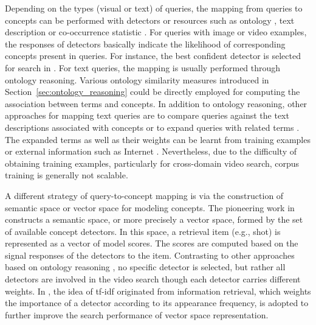 Depending on the types (visual or text) of queries, the mapping from
queries to concepts can be performed with detectors
\cite{M.Campbell:TRECVID:2006} or resources such as ontology
\cite{Shi-YongNeo:ICOIVR:2006,CeesG.M.Snoek:IEEETM:2006,C.G.M.Snoek:NISTTRECVID:2006},
text description \cite{CeesG.M.Snoek:IEEETM:2006} or co-occurrence
statistic \cite{M.Campbell:TRECVID:2006,Shi-YongNeo:ICOIVR:2006}.
%
For queries with image or video examples, the responses of detectors
basically indicate the likelihood of corresponding concepts present
in queries. For instance, the best confident detector is selected
for search in \cite{CeesG.M.Snoek:IEEETM:2006}.
%
For text queries, the mapping is usually performed through ontology
reasoning.
Various ontology similarity measures introduced in
Section~\ref{sec:ontology_reasoning} could be directly employed for
computing the association between terms and concepts.
%
In addition to ontology reasoning, other approaches for mapping text
queries are to compare queries against the text descriptions
associated with concepts \cite{CeesG.M.Snoek:IEEETM:2006} or to
expand queries with related terms \cite{Shi-YongNeo:ICOIVR:2006}.
The expanded terms as well as their weights can be learnt from
training examples \cite{M.Campbell:TRECVID:2006} or external
information such as Internet \cite{Shi-YongNeo:ICOIVR:2006}.
%
Nevertheless, due to the difficulty of obtaining training examples,
particularly for cross-domain video search, corpus training is
generally not scalable.

A different strategy of query-to-concept mapping is via the
construction of semantic space or vector space for modeling
concepts. The pioneering work in
\cite{Apostol(Paul).Natsev:ACMSIGKDD:2004,JohnR.Smith:ICME:2003}
constructs a semantic space, or more precisely a vector space,
formed by the set of available concept detectors. In this space, a
retrieval item (e.g., shot) is represented as a vector of model
scores. The scores are computed based on the signal responses of the
detectors to the item. Contrasting to other approaches based on
ontology reasoning
\cite{CeesG.M.Snoek:IEEETM:2006,Xiao-Yong.Wei:ACMMM:2007}, no
specific detector is selected, but rather all detectors are involved
in the video search though each detector carries different weights.
In \cite{Xirong.Li:CIVR:2007}, the idea of tf-idf originated from
information retrieval, which weights the importance of a detector
according to its appearance frequency, is adopted to further improve
the search performance of vector space representation.
%

